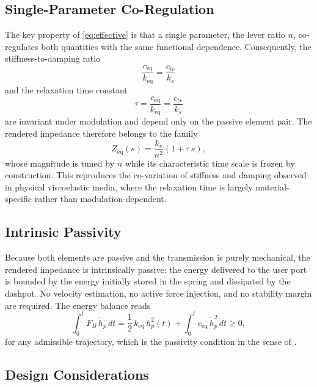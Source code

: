 ﻿\documentclass[conference]{IEEEtran}
\begin{document}
\subsection{Single-Parameter Co-Regulation}
The key property of \eqref{eq:effective} is that a single parameter, the
lever ratio $n$, co-regulates both quantities with the same functional
dependence. Consequently, the stiffness-to-damping ratio
\begin{equation}
\frac{c_{\mathrm{eq}}}{k_{\mathrm{eq}}} = \frac{c_{tr}}{k_s}
\label{eq:ratio}
\end{equation}
and the relaxation time constant
\begin{equation}
\tau = \frac{c_{\mathrm{eq}}}{k_{\mathrm{eq}}} = \frac{c_{tr}}{k_s}
\label{eq:tau}
\end{equation}
are invariant under modulation and depend only on the passive element pair.
The rendered impedance therefore belongs to the family
\begin{equation}
Z_{\mathrm{eq}}(s) = \frac{k_s}{n^{2}}\left(1 + \tau\, s\right),
\label{eq:impedance}
\end{equation}
whose magnitude is tuned by $n$ while its characteristic time scale is
frozen by construction. This reproduces the co-variation of stiffness and
damping observed in physical viscoelastic media, where the relaxation time
is largely material-specific rather than modulation-dependent.

\subsection{Intrinsic Passivity}
Because both elements are passive and the transmission is purely
mechanical, the rendered impedance is intrinsically passive: the energy
delivered to the user port is bounded by the energy initially stored in the
spring and dissipated by the dashpot. No velocity estimation, no active
force injection, and no stability margin are required. The energy balance
reads
\begin{equation}
\int_0^t F_B\,\dot{h}_p\,dt = \frac{1}{2}\,k_{\mathrm{eq}}\,h_p^2(t)
+ \int_0^t c_{\mathrm{eq}}\,\dot{h}_p^2\,dt \ge 0 ,
\label{eq:energy}
\end{equation}
for any admissible trajectory, which is the passivity condition in the sense
of \cite{colgate1994factors}.

\subsection{Design Considerations}
\end{document}
